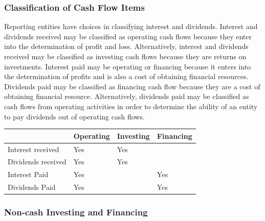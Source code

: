 \documentclass[../main.tex]{subfiles}
\begin{document}
	\subsubsection{Classification of Cash Flow Items}
	
	Reporting entities have choices in classifying interest and dividends. 
	Interest and dividends received may be classified as operating cash flows 
	because they enter into the determination of profit and loss. 
	Alternatively, interest and dividends received may be classified as 
	investing cash flows because they are returns on investments. Interest paid 
	may be operating or financing because it enters into the determination of 
	profits and is also a cost of obtaining financial resources. Dividends paid 
	may be classified as financing cash flow because they are a cost of 
	obtaining financial resource. Alternatively, dividends paid may be 
	classified as cash flows from operating activities in order to determine 
	the ability of an entity to pay dividends out of operating cash flows. 
	
	\begin{table}[ht]
		\centering
		\begin{tabular}{|p{}||p{}|
				p{0.20\columnwidth}|p{}|}
			\hline 
			& Operating & Investing & Financing \\
			\hline 
			Interest received & Yes & Yes & \\
			\hline
			Dividends received & Yes & Yes & \\
			\hline
			Interest Paid & Yes & & Yes \\
			\hline
			Dividends Paid & Yes & & Yes \\
			\hline
		\end{tabular}
	\end{table}
	
	\subsubsection{Non-cash Investing and Financing}
	
\end{document}
